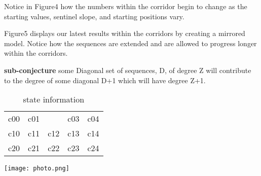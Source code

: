 \documentclass{article}
\begin{document}
Notice in Figure4 how the numbers within the corridor begin to change as the starting values, sentinel slope, and starting positions vary. 

Figure5 displays our latest results within the corridors by creating a mirrored model. Notice how the sequences are extended and are allowed to progress longer within the corridors.


\textbf{sub-conjecture} some Diagonal set of sequences, D, of degree Z will contribute to the degree of some diagonal D+1 which will have degree Z+1.

\begin{table}
\caption{state information}
\begin{center}
\begin{tabular}{ |c|c|c|c|c| } 
 \hline
 c00 & c01 &  & c03 & c04 \\ 
 c10 & c11 & c12 & c13 & c14\\ 
 c20 & c21 & c22 & c23 & c24 \\ 
 \hline
\end{tabular}
\end{center}
\end{table}



\texttt{[image: photo.png]}










 

 
\end{document}
